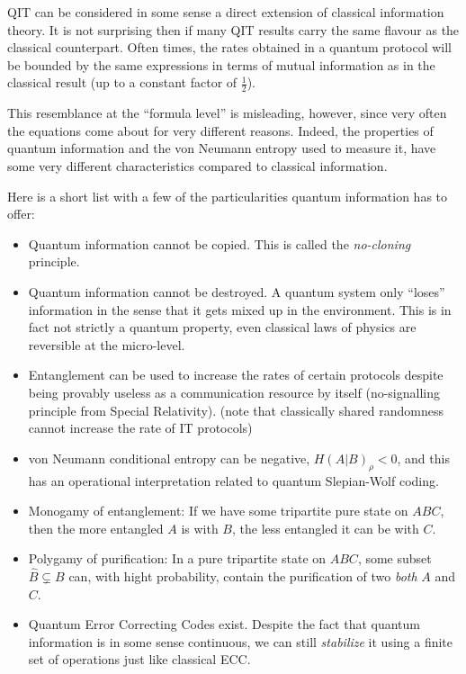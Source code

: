 \documentclass[aps,11pt,twoside,letterpaper]{article}
\begin{document}
	QIT can be considered in some sense a direct extension of classical information theory.
	It is not surprising then if many QIT results carry the same flavour as the classical counterpart.
	Often times, the rates obtained in a quantum protocol will be bounded by the same expressions 
	in terms of mutual information as in the classical result (up to a constant factor of $\frac{1}{2}$).
	
	This resemblance at the ``formula level'' is misleading, however, since very often the equations
	come about for very different reasons.
	Indeed, the properties of quantum information and the von Neumann entropy used
	to measure it, have some very different characteristics compared to classical information.
	
	Here is a short list with a few of the particularities quantum information has to offer:
	
	\begin{itemize}
		\item 	Quantum information cannot be copied. This is called the \emph{no-cloning} principle.
		\item 	Quantum information cannot be destroyed. A quantum system only ``loses'' 
				information in the sense that it gets mixed up in the environment. 
				This is in fact not strictly a quantum property, even classical laws of physics are 
				reversible at the micro-level.
		\item 	Entanglement can be used to increase the rates of certain protocols despite being
				provably useless as a communication resource by itself (no-signalling principle from Special Relativity).
				(note that classically shared randomness cannot increase the rate of IT protocols)
		\item 	von Neumann conditional entropy can be negative,
				$H(A|B)_\rho < 0$, and this has an operational interpretation related to quantum Slepian-Wolf coding.
		\item 	Monogamy of entanglement:  If we have some tripartite pure state on $ABC$,
				then the more entangled $A$ is with $B$, the less entangled it can be with $C$.
		\item		Polygamy of purification: In a pure tripartite state on $ABC$, some subset $\hat{B} \subsetneq B $ can,
				with hight probability, contain the purification of two \emph{both} $A$ and $C$.
		\item		Quantum Error Correcting Codes exist. 
				Despite the fact that quantum information is in some sense continuous,
				we can still \emph{stabilize} it using a finite set of operations just like classical ECC.
	\end{itemize}	
\end{document}
